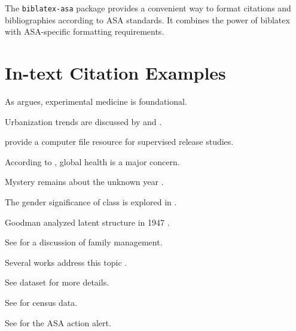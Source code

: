 \documentclass{article}
\begin{document}
The \texttt{biblatex-asa} package provides a convenient way to format citations and bibliographies according to ASA standards. It combines the power of biblatex with ASA-specific formatting requirements.

\nocite{*} %


\section*{In-text Citation Examples}

As \textcite{bernard1957} argues, experimental medicine is foundational.

Urbanization trends are discussed by \textcite{lee2021a} and \textcite{lee2021b}.

\textcite{deschenes2000} provide a computer file resource for supervised release studies.

According to \textcite{WHO2022}, global health is a major concern.

Mystery remains about the unknown year \parencite{doe_nodate}.

The gender significance of class is explored in \textcite{szelenyiForthcoming}.

Goodman analyzed latent structure in 1947 \parencite{goodman1947a, goodman1947b}.

See \parencite[pp.~63--93]{sampson1992} for a discussion of family management.

Several works address this topic \parencite{brown2022,kao2003,smith2020a}.

See dataset \textcite{charles1990} for more details.

See \textcite{usbc1960} for census data.

See \textcite{ASA1997} for the ASA action alert.


\printbibliography[title={REFERENCES}]
\end{document}
